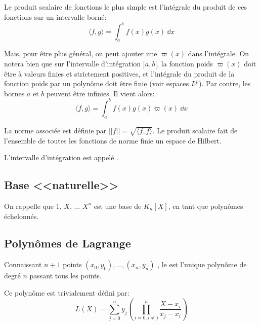 \medskip
Le produit scalaire de fonctions le plus simple est l'intégrale du produit de ces fonctions
sur un intervalle borné:
\begin{equation}
    \langle f,g \rangle=\int_a^b f(x)g(x)~\dd x
\end{equation}

\medskip
Mais, pour être plus général, on peut ajouter une  $\varpi(x)$ dans 
l'intégrale.
On notera bien que sur l'intervalle d'intégration $]a,b[$, la fonction poids $\varpi(x)$ doit être à 
valeurs finies et strictement positives, et l'intégrale du produit de la fonction poids par un polynôme 
doit être finie (voir espaces $L^p$).
Par contre, les bornes $a$ et $b$ peuvent être infinies.
Il vient alors:
\begin{equation}
    \langle f,g \rangle=\int_a^b f(x)g(x)\varpi(x)~\dd x
\end{equation}

La norme associée est définie par $||f||=\sqrt{\langle f,f \rangle}$.
Le produit scalaire fait de l'ensemble de toutes les fonctions de norme finie un 
espace de Hilbert.

L'intervalle d'intégration est appelé .




\medskip
\subsection{Base <<naturelle>>}

On rappelle que $1$, $X$, ... $X^n$ est une base de $K_n[X]$, en tant que
polynômes échelonnés.



\medskip
\subsection{Polynômes de Lagrange}

Connaissant $n + 1$ points $(x_0, y_0),\dots,(x_n, y_n)$ , le 
est l'unique polynôme de degré $n$
passant tous les points.

Ce polynôme est trivialement défini par:
\begin{equation}
L(X) = \sum_{j=0}^{n} y_j \left( \prod_{i=0, i\neq j}^{n} \frac{X-x_i}{x_j-x_i} \right) 
\end{equation}

